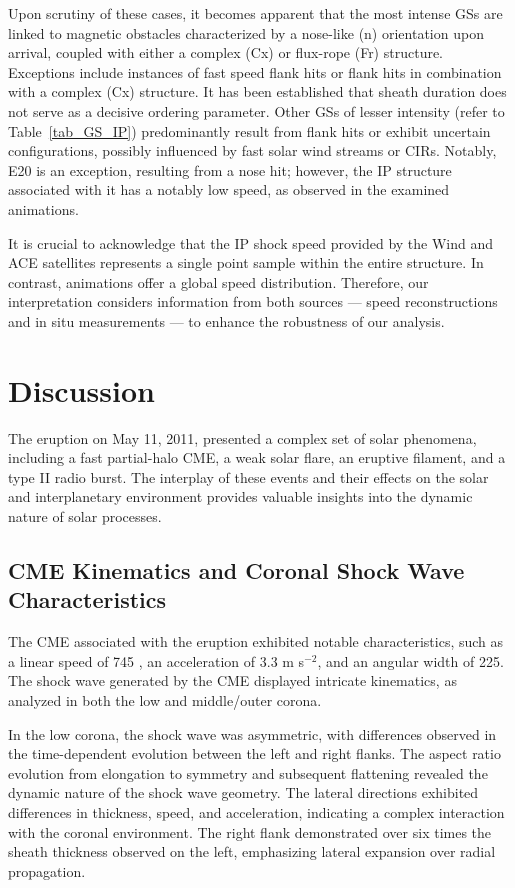 Upon scrutiny of these cases, it becomes apparent that the most intense GSs are linked to magnetic obstacles characterized by a nose-like (n) orientation upon arrival, coupled with either a complex (Cx) or flux-rope (Fr) structure. Exceptions include instances of fast speed flank hits or flank hits in combination with a complex (Cx) structure. It has been established that sheath duration does not serve as a decisive ordering parameter. Other GSs of lesser intensity (refer to Table~\ref{tab_GS_IP}) predominantly result from flank hits or exhibit uncertain configurations, possibly influenced by fast solar wind streams or CIRs. Notably, E20 is an exception, resulting from a nose hit; however, the IP structure associated with it has a notably low speed, as observed in the examined animations.

It is crucial to acknowledge that the IP shock speed provided by the Wind and ACE satellites represents a single point sample within the entire structure. In contrast, animations offer a global speed distribution. Therefore, our interpretation considers information from both sources — speed reconstructions and in situ measurements — to enhance the robustness of our analysis.

\section{Discussion}
The eruption on May 11, 2011, presented a complex set of solar phenomena, including a fast partial-halo CME, a weak solar flare, an eruptive filament, and a type II radio burst. The interplay of these events and their effects on the solar and interplanetary environment provides valuable insights into the dynamic nature of solar processes.

\subsection{CME Kinematics and Coronal Shock Wave Characteristics}
The CME associated with the eruption exhibited notable characteristics, such as a linear speed of 745 \kms, an acceleration of 3.3 m s$^{-2}$, and an angular width of 225\degree. The shock wave generated by the CME displayed intricate kinematics, as analyzed in both the low and middle/outer corona.

In the low corona, the shock wave was asymmetric, with differences observed in the time-dependent evolution between the left and right flanks. The aspect ratio evolution from elongation to symmetry and subsequent flattening revealed the dynamic nature of the shock wave geometry. The lateral directions exhibited differences in thickness, speed, and acceleration, indicating a complex interaction with the coronal environment. The right flank demonstrated over six times the sheath thickness observed on the left, emphasizing lateral expansion over radial propagation.

